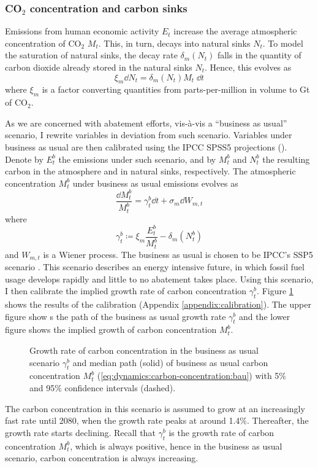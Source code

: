 \documentclass[../../main.tex]{subfiles}
\begin{document}
\subsubsection[Carbon Dioxide concentration]{CO$_2$ concentration and carbon sinks}

Emissions from human economic activity $E_t$ increase the average atmospheric concentration of CO$_2$ $M_t$. This, in turn, decays into natural sinks $N_t$. To model the saturation of natural sinks, the decay rate $\delta_m(N_t)$ falls in the quantity of carbon dioxide already stored in the natural sinks $N_t$. Hence, this evolves as \begin{equation}
    \xi_m \dd{N_t} = \delta_m(N_t) M_t \; \dd{t}
\end{equation} where $\xi_m$ is a factor converting quantities from parts-per-million in volume to \unit{Gt} of CO$_2$.

As we are concerned with abatement efforts, vis-à-vis a ``business as usual'' scenario, I rewrite variables in deviation from such scenario. Variables under business as usual are then calibrated using the IPCC SPSS5 projections (\citeyear{ipcc_climate_2023}). Denote by $E^b_t$ the emissions under such scenario, and by $M^b_t$ and $N^b_t$ the resulting carbon in the atmosphere and in natural sinks, respectively. The atmospheric concentration $M^b_t$ under business as usual emissions evolves as \begin{equation} \label{eq:dynamics:carbon-concentration:bau}
    \frac{\dd{M^b_t}}{M^b_t} = \gamma^b_t \dd{t} + \sigma_m \dd{W}_{m, t}
\end{equation} where \begin{equation}
    \gamma^b_t \coloneqq \xi_m \frac{E^b_t}{M^b_t} - \delta_m(N^b_t)
\end{equation} and $W_{m, t}$ is a Wiener process. The business as usual is chosen to be IPCC's SSP5 scenario \citep{kriegler_fossil-fueled_2017}. This scenario describes an energy intensive future, in which fossil fuel usage develops rapidly and little to no abatement takes place. Using this scenario, I then calibrate the implied growth rate of carbon concentration $\gamma_t^{b}$. Figure \ref{fig:bau-growth} shows the results of the calibration (Appendix \ref{appendix:calibration}). The upper figure show s the path of the business as usual growth rate $\gamma^b_t$ and the lower figure shows the implied growth of carbon concentration $M_t^b$. \begin{figure}[htbp]
    \centering
    
    \caption{Growth rate of carbon concentration in the business as usual scenario $\gamma^b_t$ and median path (solid) of business as usual carbon concentration $M^b_t$ (\ref{eq:dynamics:carbon-concentration:bau}) with 5\% and 95\% confidence intervals (dashed).}
    \label{fig:bau-growth}
\end{figure} \noindent The carbon concentration in this scenario is assumed to grow at an increasingly fast rate until 2080, when the growth rate peaks at around 1.4\%. Thereafter, the growth rate starts declining. Recall that $\gamma^b_t$ is the growth rate of carbon concentration $M^b_t$, which is always positive, hence in the business as usual scenario, carbon concentration is always increasing.
\end{document}
